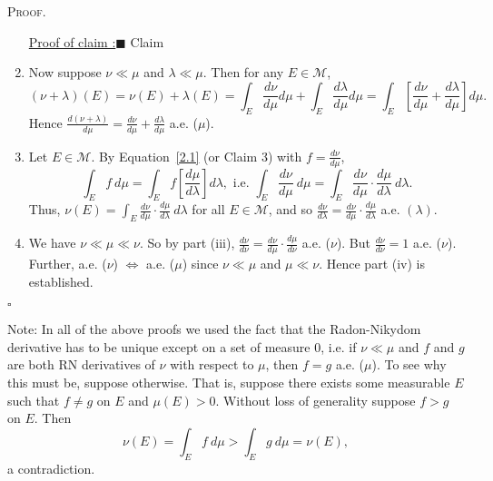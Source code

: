 \documentclass[12pt]{article}
\newcounter{ProofCounter}
\newcounter{ClaimCounter}[ProofCounter]
\newenvironment{Proof}{\stepcounter{ProofCounter}\textsc{Proof.}}{\hfill$\square$}
\newenvironment{claimproof}[1]{\par\noindent\underline{Proof of claim \theClaimCounter:}\space#1}{\hfill $\blacksquare$ Claim \theClaimCounter}
\begin{document}
\begin{Proof}
\begin{enumerate}[label = (\roman*)]
\begin{claimproof}
        \end{claimproof}
      \item Now suppose $\nu \ll \mu$ and $\lambda \ll \mu$. Then for any $E \in \mathcal{M}$,
        \[
          (\nu + \lambda)(E) = \nu(E) + \lambda(E) = \int_{E}\frac{d\nu}{d\mu}d\mu + \int_{E}\frac{d\lambda}{d\mu}d\mu = \int_{E}
          \left[ \frac{d\nu}{d\mu} + \frac{d\lambda}{d\mu} \right]d\mu.
        \]
        Hence $\frac{d(\nu + \lambda)}{d\mu} = \frac{d\nu}{d\mu} + \frac{d\lambda}{d\mu}$ a.e. ($\mu$).
      \item Let $E \in \mathcal{M}$. By Equation~\eqref{2.1} (or Claim 3) with $f = \frac{d\nu}{d\mu}$,
        \[
          \int_{E}f\ d\mu = \int_{E}f\left[ \frac{d\mu}{d\lambda} \right]d\lambda, \text{ i.e. } \int_{E}\frac{d\nu}{d\mu}\ d\mu = \int_{E}
          \frac{d\nu}{d\mu}\cdot\frac{d\mu}{d\lambda}\ d\lambda.
        \]
        Thus, $\nu(E) = \int_{E}\frac{d\nu}{d\mu}\cdot \frac{d\mu}{d\lambda}\ d\lambda$ for all $E \in \mathcal{M}$, 
        and so $\frac{d\nu}{d\lambda} = \frac{d\nu}{d\mu}\cdot
        \frac{d\mu}{d\lambda}$ a.e. $(\lambda)$.
      \item We have $\nu \ll \mu \ll \nu$. So by part (iii), $\frac{d\nu}{d\nu} = \frac{d\nu}{d\mu}\cdot \frac{d\mu}{d\nu}$ a.e. ($\nu$). But
        $\frac{d\nu}{d\nu} = 1$ a.e. ($\nu$). Further, a.e. ($\nu$) $\Leftrightarrow$ a.e. ($\mu$) since $\nu \ll \mu$ and $\mu \ll \nu$. Hence part
        (iv) is established.
  \end{enumerate}
\end{Proof}

Note: In all of the above proofs we used the fact that the Radon-Nikydom derivative has to be unique except on a set of measure 0, i.e. %
if $\nu \ll \mu$ and $f$ and $g$ are both RN derivatives of $\nu$ with respect to $\mu$, then $f = g$ a.e. ($\mu$). To see why this must be, suppose
otherwise. That is, suppose there exists some measurable $E$ such that $f \neq g$ on $E$ and $\mu(E) > 0$. Without loss of generality suppose $f > g$
on $E$. Then 
\[ \nu(E) = \int_{E}f\  d\mu > \int_{E}g\ d\mu = \nu(E), \]
a contradiction.
\end{document}
